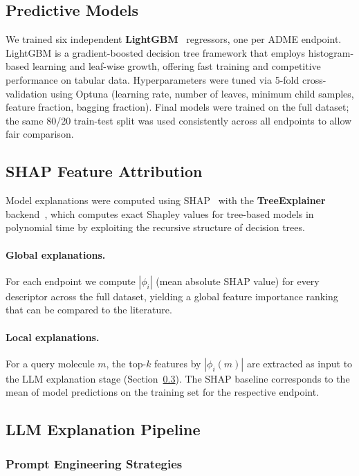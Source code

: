 \documentclass[a4paper, 11pt]{article}
\begin{document}
\subsection{Predictive Models}

We trained six independent \textbf{LightGBM}~\cite{ke2017lightgbm}
regressors, one per ADME endpoint. LightGBM is a gradient-boosted decision
tree framework that employs histogram-based learning and leaf-wise growth,
offering fast training and competitive performance on tabular data.
Hyperparameters were tuned via 5-fold cross-validation using Optuna
(learning rate, number of leaves, minimum child samples, feature fraction,
bagging fraction). Final models were trained on the full dataset; the
same 80/20 train-test split was used consistently across all endpoints to
allow fair comparison.

\subsection{SHAP Feature Attribution}

Model explanations were computed using
SHAP~\cite{lundberg2017unified} with the \textbf{TreeExplainer}
backend~\cite{lundberg2020local}, which computes exact Shapley values
for tree-based models in polynomial time by exploiting the recursive
structure of decision trees.

\paragraph{Global explanations.}
For each endpoint we compute $|\phi_i|$ (mean absolute SHAP value) for
every descriptor across the full dataset, yielding a global feature
importance ranking that can be compared to the literature.

\paragraph{Local explanations.}
For a query molecule $m$, the top-$k$ features by $|\phi_i(m)|$ are
extracted as input to the LLM explanation stage (Section~\ref{subsec:llm}).
The SHAP baseline corresponds to the mean of model predictions on the
training set for the respective endpoint.

\subsection{LLM Explanation Pipeline}
\label{subsec:llm}

\subsubsection{Prompt Engineering Strategies}
\end{document}
